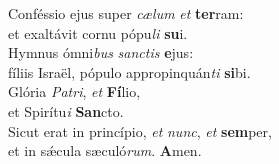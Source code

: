 \oddverse Conféssio ejus super \textit{cæ}\textit{lum} \textit{et} \textbf{ter}ram:~\*\\
\oddverse et exaltávit cornu pópu\textit{li} \textbf{su}i.\\
\evenverse Hymnus ómni\textit{bus} \textit{san}\textit{ctis} \textbf{e}jus:~\*\\
\evenverse fíliis Israël, pópulo appropinquán\textit{ti} \textbf{si}bi.\\
\oddverse Glória \textit{Pa}\textit{tri}, \textit{et} \textbf{Fí}lio,~\*\\
\oddverse et Spirítu\textit{i} \textbf{San}cto.\\
\evenverse Sicut erat in princípio, \textit{et} \textit{nunc}, \textit{et} \textbf{sem}per,~\*\\
\evenverse et in sǽcula sæculó\textit{rum}. \textbf{A}men.\\
